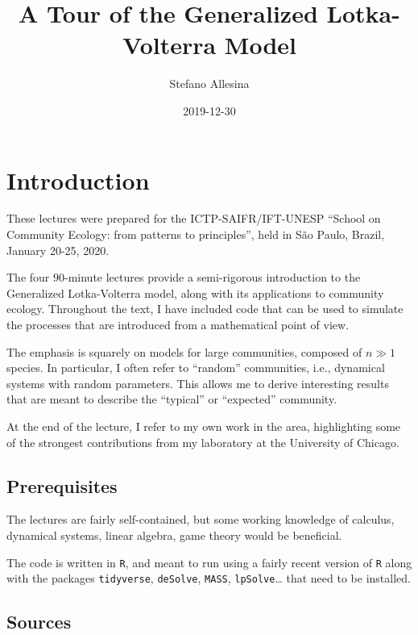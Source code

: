 \documentclass[]{book}
\title{A Tour of the Generalized Lotka-Volterra Model}
\author{Stefano Allesina}
\date{2019-12-30}
\begin{document}
\maketitle

{
\setcounter{tocdepth}{1}
\tableofcontents
}
\hypertarget{introduction}{%
\chapter{Introduction}\label{introduction}}

These lectures were prepared for the ICTP-SAIFR/IFT-UNESP ``School on Community Ecology: from patterns to principles'', held in São Paulo, Brazil, January 20-25, 2020.

The four 90-minute lectures provide a semi-rigorous introduction to the Generalized Lotka-Volterra model, along with its applications to community ecology. Throughout the text, I have included code that can be used to simulate the processes that are introduced from a mathematical point of view.

The emphasis is squarely on models for large communities, composed of \(n \gg 1\) species. In particular, I often refer to ``random'' communities, i.e., dynamical systems with random parameters. This allows me to derive interesting results that are meant to describe the ``typical'' or ``expected'' community.

At the end of the lecture, I refer to my own work in the area, highlighting some of the strongest contributions from my laboratory at the University of Chicago.

\hypertarget{prerequisites}{%
\section{Prerequisites}\label{prerequisites}}

The lectures are fairly self-contained, but some working knowledge of calculus, dynamical systems, linear algebra, game theory would be beneficial.

The code is written in \texttt{R}, and meant to run using a fairly recent version of \texttt{R} along with the packages \texttt{tidyverse}, \texttt{deSolve}, \texttt{MASS}, \texttt{lpSolve}\ldots{} that need to be installed.

\hypertarget{sources}{%
\section{Sources}\label{sources}}
\end{document}

